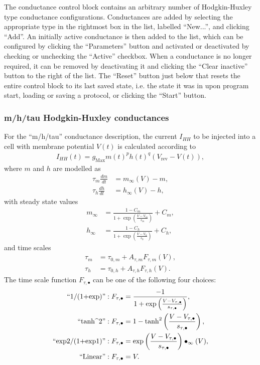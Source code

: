 \documentclass{article}
\begin{document}
The conductance control block contains an arbitrary number of Hodgkin-Huxley type
conductance configurations.
Conductances are added by selecting the appropriate type in the rightmost box in the
list, labelled ``New...'', and clicking ``Add''. An initially active conductance is
then added to the list, which can be configured by clicking the ``Parameters'' button and
activated or deactivated by checking or unchecking the ``Active'' checkbox. When a conductance is no
longer required, it can be removed by deactivating it and clicking the
``Clear inactive'' button to the right of the list. The ``Reset'' button just below that
resets the entire control block to its last saved state, i.e. the state it was in upon
program start, loading or saving a protocol, or clicking the ``Start'' button.

\subsubsection{m/h/tau Hodgkin-Huxley conductances}

For the ``m/h/tau'' conductance description, the current $I_{HH}$ to be injected
into a cell with membrane potential $V(t)$ is calculated according to
\begin{align}
  I_{HH}(t) = g_{\text{Max}} m(t)^p h(t)^q (V_{\text{rev}}-V(t)),
\end{align}
where $m$ and $h$ are modelled as
\begin{align}
  \tau_m \frac{dm}{dt} &= m_\infty(V)-m , \\
  \tau_h \frac{dh}{dt} &= h_\infty(V)- h, 
\end{align}
with steady state values
\begin{align}
  m_\infty &= \frac{1-C_m}{1+\exp \left(\frac{V - V_m}{s_m}
  \right)}+C_m, \\
  h_\infty &= \frac{1-C_h}{1+\exp \left(\frac{V - V_h}{s_h}
  \right)}+C_h, 
\end{align}
and time scales 
\begin{align}
  \tau_m &= \tau_{0,m} + A_{\tau,m} F_{\tau,m}(V), \\
  \tau_h &= \tau_{0,h} + A_{\tau,h} F_{\tau,h}(V).
\end{align}
The time scale function $F_{\tau,\bullet}$ can be one of the following four choices:
\begin{align}
  \text{``1/(1+exp)''} : F_{\tau,\bullet} &=
    \frac{-1}{1+\exp\left(\frac{V-V_{\tau,\bullet}}{s_{\tau,\bullet}}\right)}, \\
  \text{``tanh\string^2''} : F_{\tau,\bullet} &=
    1 - \tanh^2 \left( \frac{V - V_{\tau,\bullet}}{s_{\tau,\bullet}}\right), \\
  \text{``exp2/(1+exp1)''} : F_{\tau,\bullet} &=
    \exp\left(\frac{V-V_{\tau,\bullet}}{s_{\tau,\bullet}}\right) \bullet_\infty(V), \\
  \text{``Linear''} : F_{\tau,\bullet} &= V.
\end{align}
\end{document}
